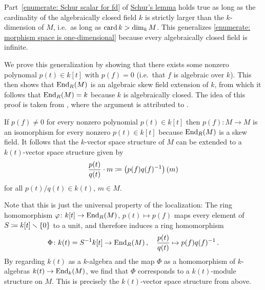 

\begin{remark}
  \label{remark: Schur for cardinality big enough}
  Part~\ref*{enumerate: Schur scalar for fd} of \hyperref[proposition: schurs lemma for modules]{Schur’s lemma} holds true as long as the cardinality of the algebraically closed field $k$ is strictly larger than the $k$-dimension of $M$, i.e.\ as long as $\operatorname{card} k > \dim_k M$.
  This generalizes \ref*{enumerate: morphism space is one-dimensional} because every algebraically closed field is infinite.

  We prove this generalization by showing that there exists some nonzero polynomal $p(t) \in k[t]$ with $p(f) = 0$ (i.e.\ that $f$ is algebraic over $k$).
  This then shows that $\operatorname{End}_R(M)$ is an algebraic skew field extension of $k$, from which it follows that $\operatorname{End}_R(M) = k$ because $k$ is algebraically closed.
  The idea of this proof is taken from \cite{Quillen}, where the argument is attributed to \cite{Dixmier}.

  If $p(f) \neq 0$ for every nonzero polynomial $p(t) \in k[t]$ then $p(f) \colon M \to M$ is an isomorphism for every nonzero $p(t) \in k[t]$ because $\operatorname{End}_R(M)$ is a skew field.
  It follows that the $k$-vector space structure of $M$ can be extended to a $k(t)$-vector space structure given by
  \[
              \frac{p(t)}{q(t)} \cdot m
    \coloneqq  \left( p(f) q(f)^{-1} \right)(m)
  \]
  for all $p(t)/q(t) \in k(t)$, $m \in M$.
  
  Note that this is just the universal property of the localization:
  The ring homomorphism $\varphi \colon k[t] \to \operatorname{End}_R(M)$, $p(t) \mapsto p(f)$ maps every element of $S \coloneqq k[t] \smallsetminus \{0\}$ to a unit, and therefore induces a ring homomorphism
  \[
            \Phi
    \colon  k(t)
    =       S^{-1} k[t]
    \to     \operatorname{End}_R(M) \,,
    \quad   \frac{p(t)}{q(t)}
    \mapsto p(f) q(f)^{-1} \,.
  \]
  By regarding $k(t)$ as a $k$-algebra and the map $\Phi$ as a homomorphism of $k$-algebras $k(t) \to \operatorname{End}_k(M)$, we find that $\Phi$ corresponds to a $k(t)$-module structure on $M$.
  This is precisely the $k(t)$-vector space structure from above.
  

\end{remark}
